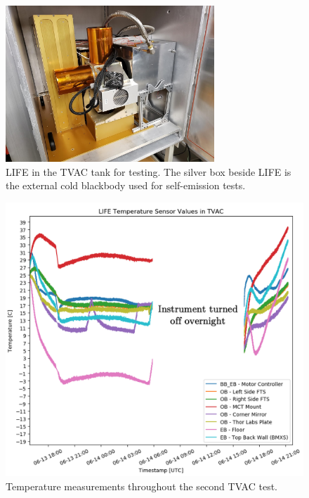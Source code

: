 \begin{figure}
    \centering
    \includegraphics[width=0.7\textwidth]{chap3_images/LIFE_in_TVAC.jpg}
    \caption{LIFE in the TVAC tank for testing. The silver box beside LIFE is the external cold blackbody used for self-emission tests.}
    \label{fig:LIFE_in_TVAC}
\end{figure}

\begin{figure}
    \centering
    \includegraphics[width=\textwidth]{chap3_images/TVAC2_V2.png}
    \caption{Temperature measurements throughout the second TVAC test.}
    \label{fig:TVAC2_data}
\end{figure}

